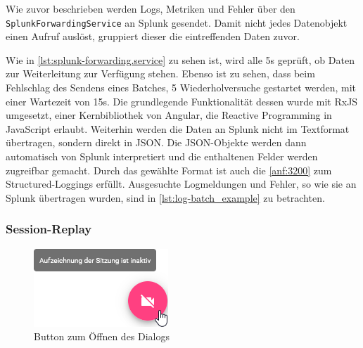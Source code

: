 Wie zuvor beschrieben werden Logs, Metriken und Fehler über den  \texttt{SplunkForwardingService} an Splunk gesendet. Damit nicht jedes Datenobjekt einen Aufruf auslöst, gruppiert dieser die eintreffenden Daten zuvor.

Wie in \autoref{lst:splunk-forwarding.service} zu sehen ist, wird alle 5s geprüft, ob Daten zur Weiterleitung zur Verfügung stehen. Ebenso ist zu sehen, dass beim Fehlschlag des Sendens eines Batches, 5 Wiederholversuche gestartet werden, mit einer Wartezeit von 15s. Die grundlegende Funktionalität dessen wurde mit RxJS \cite{RxJS} umgesetzt, einer Kernbibliothek von Angular, die Reactive Programming \cite{ReactiveProgramming} in JavaScript erlaubt. Weiterhin werden die Daten an Splunk nicht im Textformat übertragen, sondern direkt in JSON. Die JSON-Objekte werden dann automatisch von Splunk interpretiert und die enthaltenen Felder werden zugreifbar gemacht. Durch das gewählte Format \cite{StructuredAndInteroperableLogging} ist auch die \autoref{anf:3200} zum Structured-Loggings erfüllt. Ausgesuchte Logmeldungen und Fehler, so wie sie an Splunk übertragen wurden, sind in \autoref{lst:log-batch_example} zu betrachten.



\pagebreak



\subsubsection{Session-Replay}

\begin{figure}
\centering
\includegraphics[width=\linewidth]{img/04_erstellung-poc/implementierung_frontend_recording-consent_button-inactive.png}
\caption{Button zum Öffnen des Dialogs}
\label{fig:recording-consent_button-inactive}
\end{figure}

